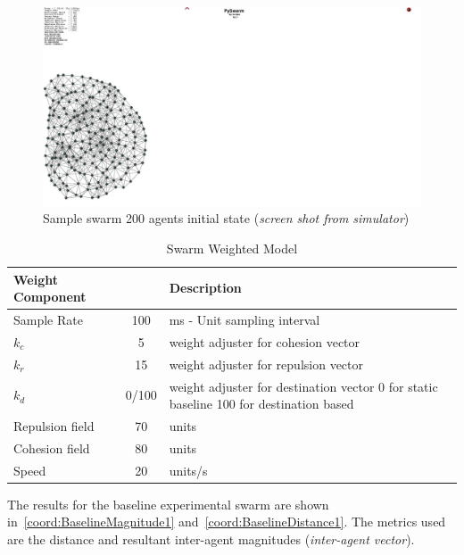\begin{figure}[H]
\begin{center}
\includegraphics[width=14cm]{CHAPTER-6/figures/SampleSwarm200-1}
\end{center}
\caption[Sample swarm 200 agents initial state]{Sample swarm 200 agents initial state (\textit{screen shot from simulator})\label{fig:SampleSwarm200-1}}
\end{figure}

\begin{table}[H]
\begin{center}
\begin{tabular}{| p{2.5cm} | c | p{7cm} |}
\hline
\bf Weight \bf Component & \bf \swarmA{} & \bf Description \\ \hline
Sample Rate & 100 & ms - Unit sampling interval\\  \hline
$k_c$ & 5 & weight adjuster for cohesion vector\\  \hline
$k_r$ & 15 & weight adjuster for repulsion  vector\\  \hline
$k_d$ & 0/100 & weight adjuster for destination vector 0 for static baseline 100 for destination based\\  \hline
Repulsion field & 70 & units\\  \hline
Cohesion field & 80 & units\\  \hline
Speed & 20 & units/s\\  \hline
\end{tabular}\caption{Swarm Weighted Model} \label{tab:DynamicPhysics1}
\end{center}
\end{table}

The results for the baseline experimental swarm are shown in~\autoref{coord:BaselineMagnitude1} and~\autoref{coord:BaselineDistance1}. The metrics used are the distance \cite{NIM:09} and resultant inter-agent magnitudes (\textit{inter-agent vector}).

